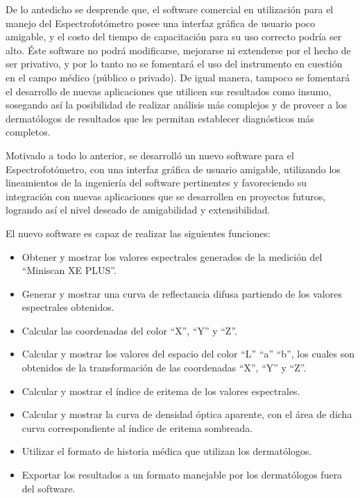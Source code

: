 \documentclass[12pt, a4paper]{article}
\begin{document}
De lo antedicho se desprende que, el software comercial en utilizaci\'{o}n para el manejo del Espectrofot\'{o}metro posee una interfaz gr\'{a}fica de usuario poco amigable, y el costo del tiempo de capacitaci\'{o}n para su uso correcto podr\'{i}a ser alto. \'{E}ste software no podr\'{a} modificarse, mejorarse ni extenderse por el hecho de ser privativo, y por lo tanto no se fomentar\'{a} el uso del instrumento en cuesti\'{o}n en el campo m\'{e}dico (p\'{u}blico o privado). De igual manera, tampoco se fomentar\'{a} el desarrollo de nuevas aplicaciones que utilicen sus resultados como insumo, sosegando as\'{i} la posibilidad de realizar an\'{a}lisis m\'{a}s complejos y de proveer a los dermat\'{o}logos de resultados que les permitan establecer diagn\'{o}sticos m\'{a}s completos.

Motivado a todo lo anterior, se desarroll\'{o} un nuevo software para el Espectrofot\'{o}metro, con una interfaz gr\'{a}fica de usuario amigable, utilizando los lineamientos de la ingenier\'{i}a del software pertinentes y favoreciendo su integraci\'{o}n con nuevas aplicaciones que se desarrollen en proyectos futuros, logrando as\'{i} el nivel deseado de amigabilidad y extensibilidad.

El nuevo software es capaz de realizar las siguientes funciones:

\begin{itemize}
	\item Obtener y mostrar los valores espectrales generados de la medici\'{o}n del ``Miniscan XE PLUS''.
	\item Generar y mostrar una curva de reflectancia difusa partiendo de los valores espectrales obtenidos.
	\item Calcular las coordenadas del color ``X'', ``Y'' y ``Z''.
	\item Calcular y mostrar los valores del espacio del color ``L'' ``a'' ``b'', los cuales son obtenidos de la transformaci\'{o}n de las coordenadas ``X'', ``Y'' y ``Z''. 
	\item Calcular y mostrar el \'{i}ndice de eritema de los valores espectrales.
	\item Calcular y mostrar la curva de densidad \'{o}ptica aparente, con el \'{a}rea de dicha curva correspondiente al \'{i}ndice de eritema sombreada.
	\item Utilizar el formato de historia m\'{e}dica que utilizan los dermat\'{o}logos.
	\item Exportar los resultados a un formato manejable por los dermat\'{o}logos fuera del software.
\end{itemize}
\end{document}
